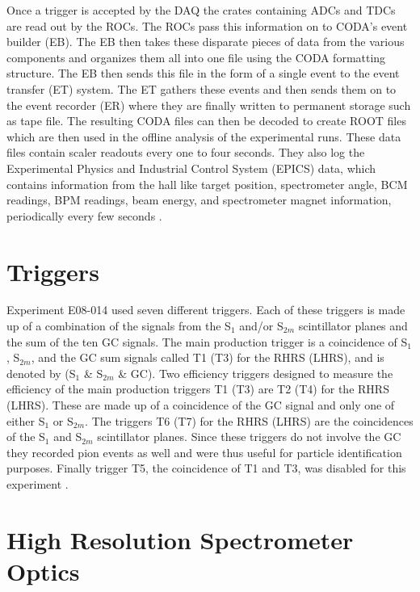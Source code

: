 Once a trigger is accepted by the DAQ the crates containing ADCs and TDCs are read out by the ROCs. The ROCs pass this information on to CODA's event builder (EB). The EB then takes these disparate pieces of data from the various components and organizes them all into one file using the CODA formatting structure. The EB then sends this file in the form of a single event to the event transfer (ET) system. The ET gathers these events and then sends them on to the event recorder (ER) where they are finally written to permanent storage such as tape file. The resulting CODA files can then be decoded to create ROOT files which are then used in the offline analysis of the experimental runs. These data files contain scaler readouts every one to four seconds. They also log the Experimental Physics and Industrial Control System (EPICS) data, which contains information from the hall like target position, spectrometer angle, BCM readings, BPM readings, beam energy, and spectrometer magnet information, periodically every few seconds \cite{Thesis:Ye} \cite{DAQ}. 

\section{Triggers}
\label{sec:triggers}

Experiment E08-014 used seven different triggers. Each of these triggers is made up of a combination of the signals from the S$_1$ and/or S$_{2m}$ scintillator planes and the sum of the ten GC signals. The main production trigger is a coincidence of S$_1$, S$_{2m}$, and the GC sum signals called T1 (T3) for the RHRS (LHRS), and is denoted by (S$_1$ \& S$_{2m}$ \& GC). Two efficiency triggers designed to measure the efficiency of the main production triggers T1 (T3) are T2 (T4) for the RHRS (LHRS). These are made up of a coincidence of the GC signal and only one of either S$_1$ or S$_{2m}$. The triggers T6 (T7) for the RHRS (LHRS) are the coincidences of the S$_1$ and S$_{2m}$ scintillator planes. Since these triggers do not involve the GC they recorded pion events as well and were thus useful for particle identification purposes. Finally trigger T5, the coincidence of T1 and T3, was disabled for this experiment \cite{Thesis:Ye}. 

\section{High Resolution Spectrometer Optics}
\label{sec:optics}


